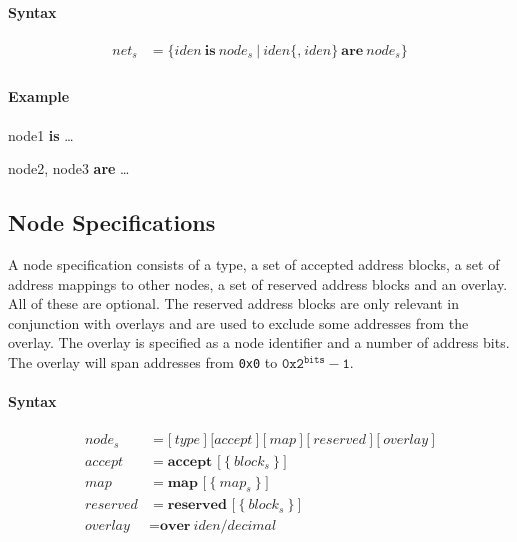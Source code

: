 \documentclass[a4paper,11pt,twoside]{report}
\begin{document}
{{{\paragraph{Syntax}
\begin{align*}
\textit{net}_s & \mathop{=}
    \Big\{
        \textit{iden}\ \textbf{is}\ \textit{node}_s\
    \Big|\
        \textit{iden}\bigl\{\textbf{,}\ \textit{iden}\bigr\}\ \textbf{are}\ \textit{node}_s
    \Big\} \\
\end{align*}

\clearpage
\paragraph{Example}
\begin{syntax}
    node1 \textbf{is} \ldots

    node2,
    node3 \textbf{are} \ldots
\end{syntax}

\subsection{Node Specifications}
A node specification consists of a type, a set of accepted address blocks, a set of address mappings to other nodes, a set of reserved address blocks and an overlay.
All of these are optional.
The reserved address blocks are only relevant in conjunction with overlays and are used to exclude some addresses from the overlay.
The overlay is specified as a node identifier and a number of address bits.
The overlay will span addresses from \texttt{0x0} to \(\texttt{0x2}^\texttt{bits} - \texttt{1}\).

\paragraph{Syntax}
\begin{align*}
\textit{node}_s & \mathop{=}
    \Big[\ 
       \textit{type}\ 
    \Big]\  
    \Big[
       \textit{accept}\ 
    \Big]\ 
    \Big[\ 
       \textit{map}\ 
    \Big]\ 
    \Big[\ 
        \textit{reserved}\ 
    \Big]\ 
    \Big[\ 
        \textit{overlay}\ 
    \Big]\\
\textit{accept} & \mathop{=}
    \textbf{accept [}\ \big\{\ \textit{block}_s\ \big\}\ \textbf{]}\\
\textit{map} & \mathop{=}
    \textbf{map [}\ \big\{\ \textit{map}_s\ \big\}\ \textbf{]}\\
\textit{reserved} & \mathop{=}
    \textbf{reserved [}\ \big\{\ \textit{block}_s\ \big\}\ \textbf{]}\\
\textit{overlay} & \mathop{=}
    \textbf{over}\ \textit{iden}\textbf{/}\textit{decimal}\\
\end{align*}

}}}
\end{document}
